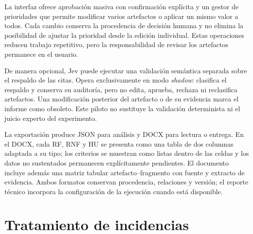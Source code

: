 La interfaz ofrece aprobación masiva con confirmación explícita y un gestor de prioridades que permite modificar varios artefactos o aplicar un mismo valor a todos. Cada cambio conserva la procedencia de decisión humana y no elimina la posibilidad de ajustar la prioridad desde la edición individual. Estas operaciones reducen trabajo repetitivo, pero la responsabilidad de revisar los artefactos permanece en el usuario.

De manera opcional, Jev puede ejecutar una validación semántica separada sobre el respaldo de las citas. Opera exclusivamente en modo \emph{shadow}: clasifica el respaldo y conserva su auditoría, pero no edita, aprueba, rechaza ni reclasifica artefactos. Una modificación posterior del artefacto o de su evidencia marca el informe como obsoleto. Este piloto no sustituye la validación determinista ni el juicio experto del experimento.

La exportación produce JSON para análisis y DOCX para lectura o entrega. En el DOCX, cada RF, RNF y HU se presenta como una tabla de dos columnas adaptada a su tipo; los criterios se muestran como listas dentro de las celdas y los datos no sustentados permanecen explícitamente pendientes. El documento incluye además una matriz tabular artefacto--fragmento con fuente y extracto de evidencia. Ambos formatos conservan procedencia, relaciones y versión; el reporte técnico incorpora la configuración de la ejecución cuando está disponible.

\section{Tratamiento de incidencias}

